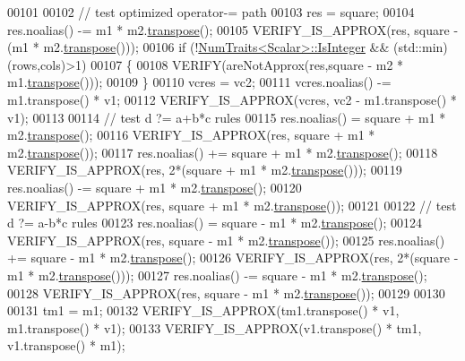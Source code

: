 \begin{DoxyCode}
00101 
00102   \textcolor{comment}{// test optimized operator-= path}
00103   res = square;
00104   res.noalias() -= m1 * m2.\hyperlink{group___core___module_ac8952c19644a4ac7e41bea45c19b909c}{transpose}();
00105   VERIFY\_IS\_APPROX(res, square - (m1 * m2.\hyperlink{group___core___module_ac8952c19644a4ac7e41bea45c19b909c}{transpose}()));
00106   \textcolor{keywordflow}{if} (!\hyperlink{group___core___module_struct_eigen_1_1_num_traits}{NumTraits<Scalar>::IsInteger} && (std::min)(rows,cols)>1)
00107   \{
00108     VERIFY(areNotApprox(res,square - m2 * m1.\hyperlink{group___core___module_ac8952c19644a4ac7e41bea45c19b909c}{transpose}()));
00109   \}
00110   vcres = vc2;
00111   vcres.noalias() -= m1.transpose() * v1;
00112   VERIFY\_IS\_APPROX(vcres, vc2 - m1.transpose() * v1);
00113 
00114   \textcolor{comment}{// test d ?= a+b*c rules}
00115   res.noalias() = square + m1 * m2.\hyperlink{group___core___module_ac8952c19644a4ac7e41bea45c19b909c}{transpose}();
00116   VERIFY\_IS\_APPROX(res, square + m1 * m2.\hyperlink{group___core___module_ac8952c19644a4ac7e41bea45c19b909c}{transpose}());
00117   res.noalias() += square + m1 * m2.\hyperlink{group___core___module_ac8952c19644a4ac7e41bea45c19b909c}{transpose}();
00118   VERIFY\_IS\_APPROX(res, 2*(square + m1 * m2.\hyperlink{group___core___module_ac8952c19644a4ac7e41bea45c19b909c}{transpose}()));
00119   res.noalias() -= square + m1 * m2.\hyperlink{group___core___module_ac8952c19644a4ac7e41bea45c19b909c}{transpose}();
00120   VERIFY\_IS\_APPROX(res, square + m1 * m2.\hyperlink{group___core___module_ac8952c19644a4ac7e41bea45c19b909c}{transpose}());
00121 
00122   \textcolor{comment}{// test d ?= a-b*c rules}
00123   res.noalias() = square - m1 * m2.\hyperlink{group___core___module_ac8952c19644a4ac7e41bea45c19b909c}{transpose}();
00124   VERIFY\_IS\_APPROX(res, square - m1 * m2.\hyperlink{group___core___module_ac8952c19644a4ac7e41bea45c19b909c}{transpose}());
00125   res.noalias() += square - m1 * m2.\hyperlink{group___core___module_ac8952c19644a4ac7e41bea45c19b909c}{transpose}();
00126   VERIFY\_IS\_APPROX(res, 2*(square - m1 * m2.\hyperlink{group___core___module_ac8952c19644a4ac7e41bea45c19b909c}{transpose}()));
00127   res.noalias() -= square - m1 * m2.\hyperlink{group___core___module_ac8952c19644a4ac7e41bea45c19b909c}{transpose}();
00128   VERIFY\_IS\_APPROX(res, square - m1 * m2.\hyperlink{group___core___module_ac8952c19644a4ac7e41bea45c19b909c}{transpose}());
00129 
00130 
00131   tm1 = m1;
00132   VERIFY\_IS\_APPROX(tm1.transpose() * v1, m1.transpose() * v1);
00133   VERIFY\_IS\_APPROX(v1.transpose() * tm1, v1.transpose() * m1);

\end{DoxyCode}
